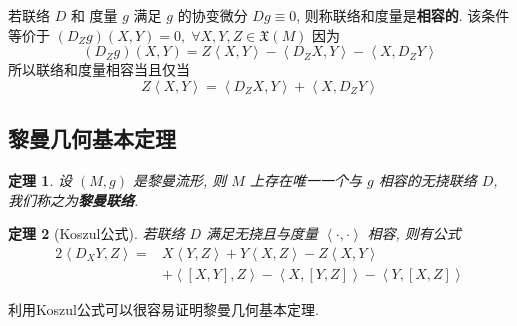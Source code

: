 \documentclass{book}
\newtheorem{theorem}{\indent 定理}[section]
\begin{document}
        若联络 $D$ 和 度量 $g$ 满足 $g$ 的协变微分 $Dg\equiv0$, 则称联络和度量是\textbf{相容的}. 该条件等价于 $(D_Zg)(X,Y)=0,\;\forall X,Y,Z\in\mathfrak{X}(M)$ 因为
        \begin{equation*}
            (D_Zg)(X,Y) = Z\left\langle X,Y\right\rangle - \left\langle D_ZX,Y\right\rangle - \left\langle X,D_ZY\right\rangle
        \end{equation*}
        所以联络和度量相容当且仅当
        \begin{equation*}
            Z\left\langle X,Y\right\rangle = \left\langle D_ZX,Y\right\rangle + \left\langle X,D_ZY\right\rangle
        \end{equation*}

    \subsection{黎曼几何基本定理}
        \begin{theorem}
            设 $(M,g)$ 是黎曼流形, 则 $M$ 上存在唯一一个与 $g$ 相容的无挠联络 $D$, 我们称之为\textbf{黎曼联络}.
        \end{theorem}

        \begin{theorem}[Koszul公式] \label{eq:koszul}
            若联络 $D$ 满足无挠且与度量 $\left\langle \cdot,\cdot\right\rangle$ 相容, 则有公式
            \begin{align}
                2\left\langle D_XY,Z\right\rangle =& X\left\langle Y,Z\right\rangle+ Y\left\langle X,Z\right\rangle -Z\left\langle X,Y\right\rangle \nonumber \\
                & +\left\langle [X,Y],Z\right\rangle -\left\langle X,[Y,Z]\right\rangle -\left\langle Y,[X,Z]\right\rangle
            \end{align}
        \end{theorem}
        利用Koszul公式可以很容易证明黎曼几何基本定理.
\end{document}
